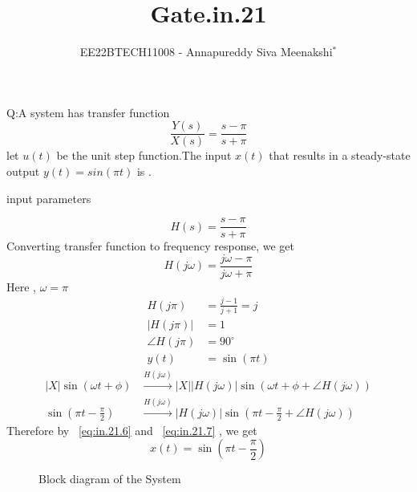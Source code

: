 \documentclass[journal,12pt,twocolumn]{IEEEtran}
\newcommand{\system}[1]{\stackrel{#1}{\rightarrow}}
\theoremstyle{remark}
\begin{document}

\vspace{3cm}

\title{Gate.in.21}
\author{EE22BTECH11008 - Annapureddy Siva Meenakshi$^{*}$%
}
\maketitle
\bigskip

\renewcommand{\thefigure}{\theenumi}
\renewcommand{\thetable}{\theenumi}
Q:A system has transfer function
 \[\frac{Y(s)}{X(s)}=\frac {s-\pi}{s+\pi}\]
 let $u(t)$ be the unit step function.The input $x(t)$ that results in a steady-state output $y(t)=sin(\pi t)$ is \underline{\quad}.
\solution
\begin{table}[!ht]
    \centering
        
    \caption{input parameters}
    \label{tab:in_21_t1}
\end{table}
 \begin{equation}
     H(s)=\frac{s-\pi}{s+\pi}
 \end{equation} 
 Converting transfer function to frequency response, we get
 \begin{equation}
     H(j\omega)=\frac{j\omega-\pi}{j\omega+\pi}
 \end{equation}
 Here , $\omega=\pi$
 \begin{align}
    H(j\pi)&=\frac{j-1}{j+1}=j\\
     |H(j\pi)|&=1\\
    \angle H(j\pi)&=90^\circ\\
    y(t)&=\sin(\pi t)\label{eq:in.21.6} 
\end{align}
\begin{align}
  |X|\sin(\omega t+\phi)&\system{H(j\omega)}|X||H(j\omega)|\sin(\omega t +\phi +\angle H(j\omega))\label{eq:in.21.7}\\
  \sin\left(\pi t-\frac{\pi}{2}\right)&\system{H(j\omega)}|H(j\omega)|\sin\left(\pi t -\frac{\pi}{2} +\angle H(j\omega)\right)
\end{align}
Therefore by ~\eqref{eq:in.21.6} and ~\eqref{eq:in.21.7} , we get
\begin{equation}
    x(t)=\sin\left(\pi t -\frac{\pi}{2}\right)
\end{equation}

\begin{figure}[htb]
  \centering
  
  \captionsetup{justification=centering, singlelinecheck=off}
  \caption{Block diagram of the System}
  \label{fig:tikz_circuit}
\end{figure}

 
\end{document}
